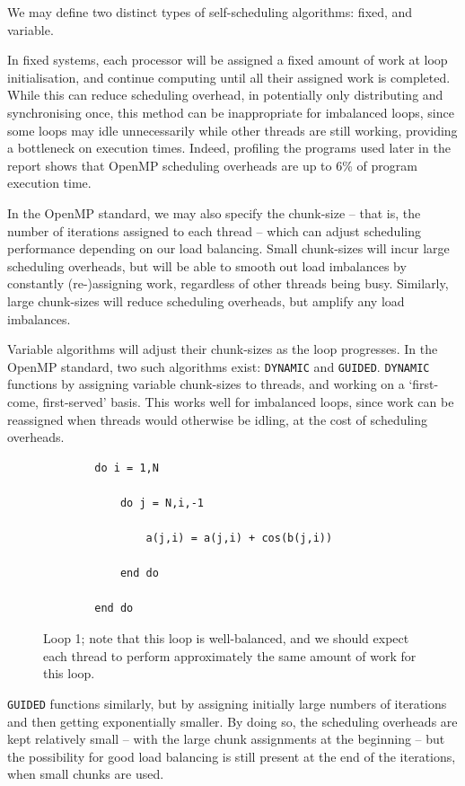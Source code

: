 \documentclass{article} %
\newcommand{\tp}{\texttt}
\begin{document}
We may define two distinct types of self-scheduling algorithms: fixed, and variable.

In fixed systems, each processor will be assigned a fixed amount of work at loop initialisation, and continue computing until all their assigned work is completed.
While this can reduce scheduling overhead, in potentially only distributing and synchronising once, this method can be inappropriate for imbalanced loops, since some loops may idle unnecessarily while other threads are still working, providing a bottleneck on execution times.
Indeed, profiling the programs used later in the report shows that OpenMP scheduling overheads are up to 6\% of program execution time.

In the OpenMP standard, we may also specify the chunk-size -- that is, the number of iterations assigned to each thread -- which can adjust scheduling performance depending on our load balancing.
Small chunk-sizes will incur large scheduling overheads, but will be able to smooth out load imbalances by constantly (re-)assigning work, regardless of other threads being busy.
Similarly, large chunk-sizes will reduce scheduling overheads, but amplify any load imbalances.

Variable algorithms will adjust their chunk-sizes as the loop progresses. 
In the OpenMP standard, two such algorithms exist: \tp{DYNAMIC} and \tp{GUIDED}.
\tp{DYNAMIC} functions by assigning variable chunk-sizes to threads, and working on a `first-come, first-served' basis.
This works well for imbalanced loops, since work can be reassigned when threads would otherwise be idling, at the cost of scheduling overheads.

\begin{figure}
    \begin{lstlisting}
        do i = 1,N

            do j = N,i,-1
        
                a(j,i) = a(j,i) + cos(b(j,i))
        
            end do
      
        end do
    \end{lstlisting}
    \caption{Loop 1; note that this loop is well-balanced, and we should expect each thread to perform approximately the same amount of work for this loop.}
    \label{listing:loop1}
\end{figure}

\tp{GUIDED} functions similarly, but by assigning initially large numbers of iterations and then getting exponentially smaller.
By doing so, the scheduling overheads are kept relatively small -- with the large chunk assignments at the beginning -- but the possibility for good load balancing is still present at the end of the iterations, when small chunks are used.
\end{document}
